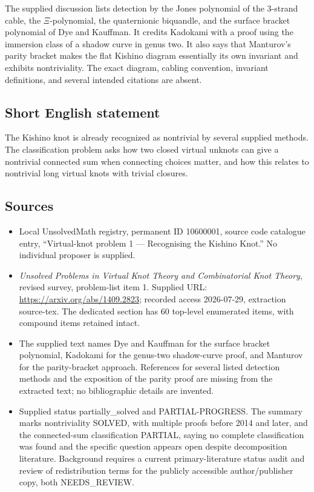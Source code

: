 \documentclass[11pt]{article}
\begin{document}
The supplied discussion lists detection by the Jones polynomial of the \(3\)-strand cable, the \(\Xi\)-polynomial, the quaternionic biquandle, and the surface bracket polynomial of Dye and Kauffman. It credits Kadokami with a proof using the immersion class of a shadow curve in genus two. It also says that Manturov's parity bracket makes the flat Kishino diagram essentially its own invariant and exhibits nontriviality. The exact diagram, cabling convention, invariant definitions, and several intended citations are absent.
\subsection{Short English statement}
The Kishino knot is already recognized as nontrivial by several supplied methods. The classification problem asks how two closed virtual unknots can give a nontrivial connected sum when connecting choices matter, and how this relates to nontrivial long virtual knots with trivial closures.
\subsection{Sources}
\begin{itemize}
\item Local UnsolvedMath registry, permanent ID 10600001, source code catalogue entry, ``Virtual-knot problem 1 --- Recognising the Kishino Knot.'' No individual proposer is supplied.
\item \emph{Unsolved Problems in Virtual Knot Theory and Combinatorial Knot Theory}, revised survey, problem-list item 1. Supplied URL: \url{https://arxiv.org/abs/1409.2823}; recorded access 2026-07-29, extraction source-tex. The dedicated section has 60 top-level enumerated items, with compound items retained intact.
\item The supplied text names Dye and Kauffman for the surface bracket polynomial, Kadokami for the genus-two shadow-curve proof, and Manturov for the parity-bracket approach. References for several listed detection methods and the exposition of the parity proof are missing from the extracted text; no bibliographic details are invented.
\item Supplied status partially\_solved and PARTIAL-PROGRESS. The summary marks nontriviality SOLVED, with multiple proofs before 2014 and later, and the connected-sum classification PARTIAL, saying no complete classification was found and the specific question appears open despite decomposition literature. Background requires a current primary-literature status audit and review of redistribution terms for the publicly accessible author/publisher copy, both NEEDS\_REVIEW.
\end{itemize}
\end{document}

